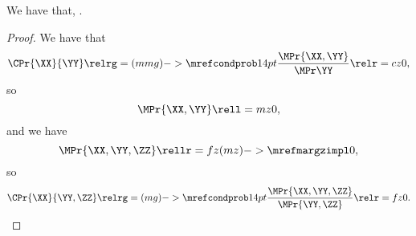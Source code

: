 \begin{proposition}
  \nrp
  We have that, \pzerocindprop.%
\end{proposition}

\begin{proof}
  \nrp
  We have that 
  $$\CPr{\XX}{\YY} \relrg = (mmg)->{\mrefcondprob} 14pt \frac{\MPr{\XX, \YY}}{\MPr\YY} \relr = cz 0,$$
  \nrp
  so 
  $$\MPr{\XX, \YY} \rell = mz 0,$$
  \nrp
  and we have
  $$\MPr{\XX, \YY, \ZZ} \rellr = fz (mz)->{\mrefmargzimpl} 0,$$
  \nrp
  so
  $$\CPr{\XX}{\YY, \ZZ} \relrg = (mg)->{\mrefcondprob} 14pt \frac{\MPr{\XX, \YY, \ZZ}}{\MPr{\YY,\ZZ}} \relr = fz 0.$$
\end{proof}

